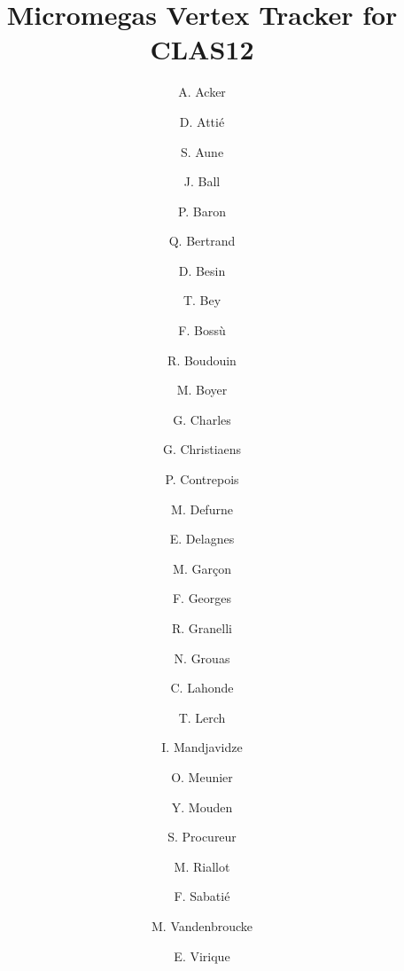 \title{Micromegas Vertex Tracker for CLAS12}

\author{A. Acker} 
\author{D. Atti\'e}
\author{S. Aune}
\author{J. Ball}
\author{P. Baron}
\author{Q. Bertrand}
\author{D. Besin}
\author{T. Bey}
\author{F. Boss\`u}
\author{R. Boudouin}
\author{M. Boyer}
\author{G. Charles}
\author{G. Christiaens}
\author{P. Contrepois}
\author{M. Defurne}
\author{E. Delagnes}
\author{M. Gar\c con}
\author{F. Georges}
\author{R. Granelli}
\author{N. Grouas}
\author{C. Lahonde}
\author{T. Lerch}
\author{I. Mandjavidze}
\author{O. Meunier}
\author{Y. Mouden}
\author{S. Procureur}
\author{M. Riallot}
\author{F. Sabati\'e}
\author{M. Vandenbroucke}
\author{E. Virique}



\address{Irfu, CEA, Universit\'{e} Paris-Saclay, 91191, Gif-sur-Yvette, France}
